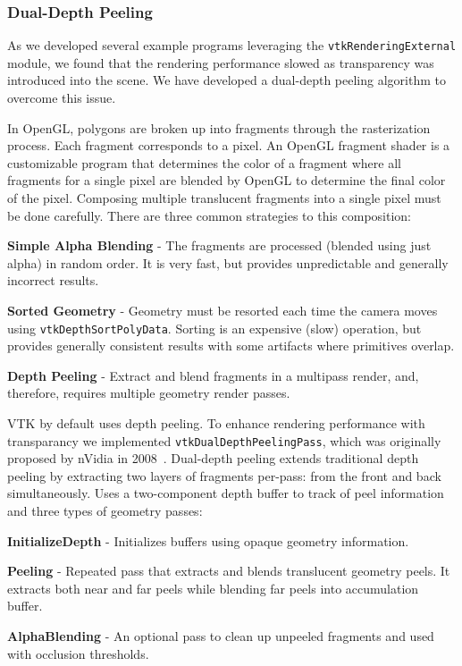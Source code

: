 \subsubsection{Dual-Depth Peeling}

As we developed several example programs leveraging the \texttt{vtkRenderingExternal} module, we found that the rendering performance slowed as transparency was introduced into the scene. We have developed a dual-depth peeling algorithm to overcome this issue.

In OpenGL, polygons are broken up into fragments through the rasterization process.
Each fragment corresponds to a pixel.
An OpenGL fragment shader is a customizable program that determines the color of a fragment where all fragments for a single pixel are blended by OpenGL to determine the final color of the pixel.
Composing multiple translucent fragments into a single pixel must be done carefully.
There are three common strategies to this composition:

\begin{compactitem}
\item \textbf{Simple Alpha Blending} - The fragments are processed (blended using just alpha) in random order.
It is very fast, but provides unpredictable and generally incorrect results.
\item \textbf{Sorted Geometry} - Geometry must be resorted each time the camera moves using \texttt{vtkDepthSortPolyData}.
Sorting is an expensive (slow) operation, but provides generally consistent results with some artifacts where primitives overlap.
\item \textbf{Depth Peeling} - Extract and blend fragments in a multipass render, and, therefore, requires multiple geometry render passes.
\end{compactitem}

VTK by default uses depth peeling.
To enhance rendering performance with transparancy we implemented \texttt{vtkDualDepthPeelingPass}, which was originally proposed by nVidia in 2008~\cite{Bavoil:2008}.
Dual-depth peeling extends traditional depth peeling by extracting two layers of fragments per-pass: from the front and back simultaneously.
Uses a two-component depth buffer to track of peel information and three types of geometry passes:

\begin{compactitem}
\item \textbf{InitializeDepth} - Initializes buffers using opaque geometry information.
\item \textbf{Peeling} - Repeated pass that extracts and blends translucent geometry peels.
It extracts both near and far peels while blending far peels into accumulation buffer.
\item \textbf{AlphaBlending} - An optional pass to clean up unpeeled fragments and used with occlusion thresholds.
\end{compactitem}

